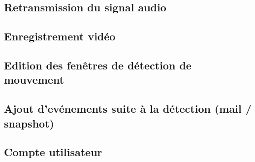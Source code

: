 \subsection{Retransmission du signal audio}
\subsection{Enregistrement vidéo}
\subsection{Edition des fenêtres de détection  de mouvement}
\subsection{Ajout d'evénements suite à la détection (mail / snapshot)}
\subsection{Compte utilisateur}
\clearpage
